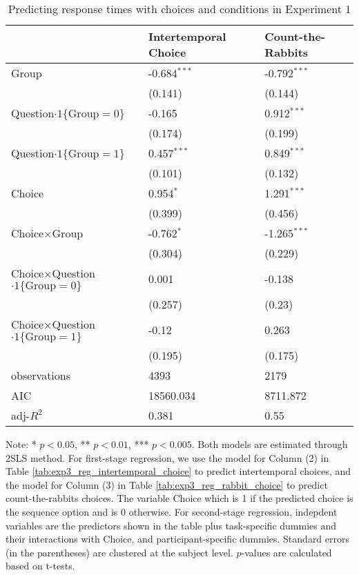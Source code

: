 
\begin{table}[!h]
    \caption{Predicting response times with choices and conditions in Experiment 1}
    \vspace*{10pt}
    \centering

      \begin{tabular}{lll}
\hline
 & Intertemporal Choice & Count-the-Rabbits \\
\hline
Group & -0.684$^{***}$ & -0.792$^{***}$ \\
 & (0.141) & (0.144) \\
Question$\cdot1\{\text{Group}=0\}$ & -0.165 & 0.912$^{***}$ \\
 & (0.174) & (0.199) \\
Question$\cdot1\{\text{Group}=1\}$ & 0.457$^{***}$ & 0.849$^{***}$ \\
 & (0.101) & (0.132) \\
Choice & 0.954$^{*}$ & 1.291$^{***}$ \\
 & (0.399) & (0.456) \\
Choice$\times$Group & -0.762$^{*}$ & -1.265$^{***}$ \\
 & (0.304) & (0.229) \\
Choice$\times$Question$\cdot1\{\text{Group}=0\}$ & 0.001 & -0.138 \\
 & (0.257) & (0.23) \\
Choice$\times$Question$\cdot1\{\text{Group}=1\}$ & -0.12 & 0.263 \\
 & (0.195) & (0.175) \\\hline

observations & 4393 & 2179 \\
AIC & 18560.034 & 8711.872 \\
adj-$R^2$ & 0.381 & 0.55 \\
\hline
\end{tabular}

    \vspace*{4pt}
    \centering
    \begin{minipage}{0.85\textwidth}
    {\par\footnotesize Note: * $p<0.05$, ** $p<0.01$, *** $p<0.005$. Both models are estimated through 2SLS method. For first-stage regression, we use the model for Column (2) in Table \ref{tab:exp3_reg_intertemporal_choice} to predict intertemporal choices, and the model for Column (3) in Table \ref{tab:exp3_reg_rabbit_choice} to predict count-the-rabbits choices. The variable Choice which is 1 if the predicted choice is the sequence option and is 0 otherwise. For second-stage regression, indepdent variables are the predictors shown in the table plus task-specific dummies and their interactions with Choice, and participant-specific dummies. Standard errors (in the parentheses) are clustered at the subject level. $p$-values are calculated based on t-tests. }
    \end{minipage}
    \label{tab:exp3_reg_response_time}
\end{table}


